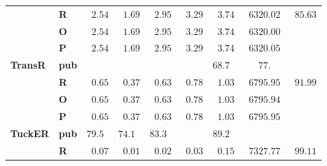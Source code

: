 \begin{tabular}{llrrrrrrr}
       & \textbf{R} &  $\phantom{0}2.54$ &  $\phantom{0}1.69$ &  $\phantom{0}2.95$ &  $\phantom{0}3.29$ &  $\phantom{0}3.74$ &            $\phantom{0}6320.02$ &  $\phantom{0}85.63$ \\
       & \textbf{O} &  $\phantom{0}2.54$ &  $\phantom{0}1.69$ &  $\phantom{0}2.95$ &  $\phantom{0}3.29$ &  $\phantom{0}3.74$ &            $\phantom{0}6320.00$ &                     \\
       & \textbf{P} &  $\phantom{0}2.54$ &  $\phantom{0}1.69$ &  $\phantom{0}2.95$ &  $\phantom{0}3.29$ &  $\phantom{0}3.74$ &            $\phantom{0}6320.05$ &                     \\\midrule
\textbf{TransR} & \textbf{pub} &                    &                    &                    &                    &  $68.7\phantom{0}$ &  $\phantom{000}77.\phantom{00}$ &                     \\
       & \textbf{R} &  $\phantom{0}0.65$ &  $\phantom{0}0.37$ &  $\phantom{0}0.63$ &  $\phantom{0}0.78$ &  $\phantom{0}1.03$ &            $\phantom{0}6795.95$ &  $\phantom{0}91.99$ \\
       & \textbf{O} &  $\phantom{0}0.65$ &  $\phantom{0}0.37$ &  $\phantom{0}0.63$ &  $\phantom{0}0.78$ &  $\phantom{0}1.03$ &            $\phantom{0}6795.94$ &                     \\
       & \textbf{P} &  $\phantom{0}0.65$ &  $\phantom{0}0.37$ &  $\phantom{0}0.63$ &  $\phantom{0}0.78$ &  $\phantom{0}1.03$ &            $\phantom{0}6795.95$ &                     \\\midrule
\textbf{TuckER} & \textbf{pub} &  $79.5\phantom{0}$ &  $74.1\phantom{0}$ &  $83.3\phantom{0}$ &                    &  $89.2\phantom{0}$ &                                 &                     \\
       & \textbf{R} &  $\phantom{0}0.07$ &  $\phantom{0}0.01$ &  $\phantom{0}0.02$ &  $\phantom{0}0.03$ &  $\phantom{0}0.15$ &            $\phantom{0}7327.77$ &  $\phantom{0}99.11$ \\
\bottomrule
\end{tabular}

